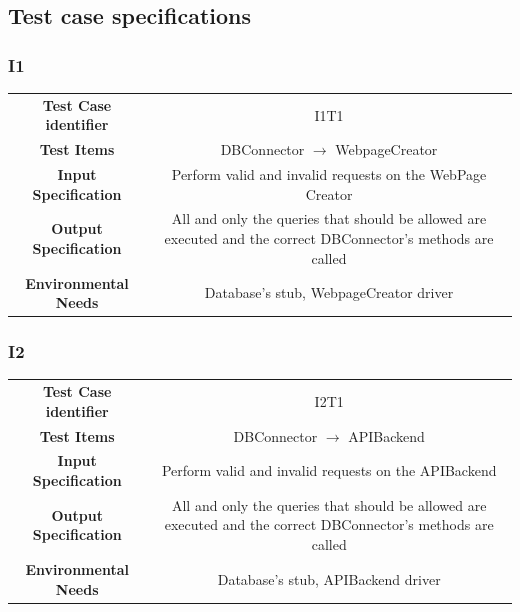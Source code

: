 \documentclass{article}
\begin{document}
\subsection{Test case specifications}
\subsubsection{I1}
\begin{adjustbox}{width=1.2\textwidth}	
	\begin{tabular}{*{2}{c}}
		\toprule
		\textbf{Test Case identifier} & I1T1\\
		\textbf{Test Items} & DBConnector $\rightarrow$ WebpageCreator\\
		\textbf{Input Specification} & Perform valid and invalid requests on the WebPage Creator\\
		\textbf{Output Specification} & All and only the queries that should be allowed are executed and the correct DBConnector's methods are called\\
		\textbf{Environmental Needs} & Database's stub, WebpageCreator driver\\
		\bottomrule
	\end{tabular}
\end{adjustbox}
\subsubsection{I2}
\begin{adjustbox}{width=1.2\textwidth}	
	\begin{tabular}{*{2}{c}}
		\toprule
		\textbf{Test Case identifier} & I2T1\\
		\textbf{Test Items} & DBConnector $\rightarrow$ APIBackend\\
		\textbf{Input Specification} & Perform valid and invalid requests on the APIBackend\\
		\textbf{Output Specification} & All and only the queries that should be allowed are executed and the correct DBConnector's methods are called\\
		\textbf{Environmental Needs} & Database's stub, APIBackend driver\\
		\bottomrule
	\end{tabular}
\end{adjustbox}
\end{document}
